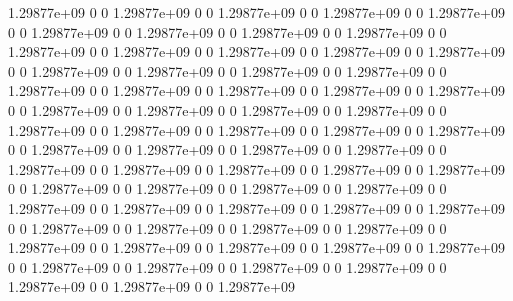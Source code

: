 1.29877e+09 0 0
1.29877e+09 0 0
1.29877e+09 0 0
1.29877e+09 0 0
1.29877e+09 0 0
1.29877e+09 0 0
1.29877e+09 0 0
1.29877e+09 0 0
1.29877e+09 0 0
1.29877e+09 0 0
1.29877e+09 0 0
1.29877e+09 0 0
1.29877e+09 0 0
1.29877e+09 0 0
1.29877e+09 0 0
1.29877e+09 0 0
1.29877e+09 0 0
1.29877e+09 0 0
1.29877e+09 0 0
1.29877e+09 0 0
1.29877e+09 0 0
1.29877e+09 0 0
1.29877e+09 0 0
1.29877e+09 0 0
1.29877e+09 0 0
1.29877e+09 0 0
1.29877e+09 0 0
1.29877e+09 0 0
1.29877e+09 0 0
1.29877e+09 0 0
1.29877e+09 0 0
1.29877e+09 0 0
1.29877e+09 0 0
1.29877e+09 0 0
1.29877e+09 0 0
1.29877e+09 0 0
1.29877e+09 0 0
1.29877e+09 0 0
1.29877e+09 0 0
1.29877e+09 0 0
1.29877e+09 0 0
1.29877e+09 0 0
1.29877e+09 0 0
1.29877e+09 0 0
1.29877e+09 0 0
1.29877e+09 0 0
1.29877e+09 0 0
1.29877e+09 0 0
1.29877e+09 0 0
1.29877e+09 0 0
1.29877e+09 0 0
1.29877e+09 0 0
1.29877e+09 0 0
1.29877e+09 0 0
1.29877e+09 0 0
1.29877e+09 0 0
1.29877e+09 0 0
1.29877e+09 0 0
1.29877e+09 0 0
1.29877e+09 0 0
1.29877e+09 0 0
1.29877e+09 0 0
1.29877e+09 0 0
1.29877e+09 0 0
1.29877e+09 0 0
1.29877e+09
